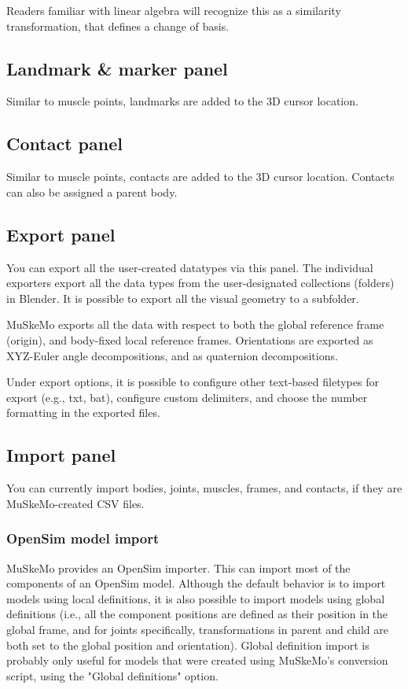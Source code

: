 \documentclass{article}
\begin{document}
Readers familiar with linear algebra will recognize this as a similarity transformation, that defines a change of basis.

\subsection{Landmark \& marker panel}

Similar to muscle points, landmarks are added to the 3D cursor location.

\subsection{Contact panel}

Similar to muscle points, contacts are added to the 3D cursor location. Contacts can also be assigned a parent body.

\subsection{Export panel}
\label{sec:exportpanel}
You can export all the user-created datatypes via this panel. The individual exporters export all the data types from the user-designated collections (folders) in Blender. It is possible to export all the visual geometry to a subfolder.

MuSkeMo exports all the data with respect to both the global reference frame (origin), and body-fixed local reference frames. Orientations are exported as XYZ-Euler angle decompositions, and as quaternion decompositions.

Under export options, it is possible to configure other text-based filetypes for export (e.g., txt, bat), configure custom delimiters, and choose the number formatting in the exported files.


\subsection{Import panel}

You can currently import bodies, joints, muscles, frames, and contacts, if they are MuSkeMo-created CSV files.

\subsubsection{OpenSim model import}
\label{sec:opensimimporter}
MuSkeMo provides an OpenSim importer. This can import most of the components of an OpenSim model. Although the default behavior is to import models using local definitions, it is also possible to import models using global definitions (i.e., all the component positions are defined as their position in the global frame, and for joints specifically, transformations in parent and child are both set to the global position and orientation). Global definition import is probably only useful for models that were created using MuSkeMo's conversion script, using the "Global definitions" option.
\end{document}
